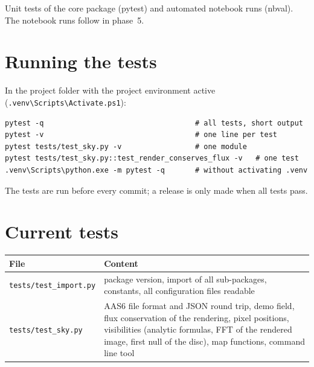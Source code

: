 \label{ch:tests}

Unit tests of the core package (pytest) and automated notebook runs
(nbval). The notebook runs follow in phase~5.

\section{Running the tests}

In the project folder with the project environment active
(\texttt{.venv\textbackslash Scripts\textbackslash Activate.ps1}):
\begin{lstlisting}[basicstyle=\ttfamily\footnotesize, frame=single]
pytest -q                                   # all tests, short output
pytest -v                                   # one line per test
pytest tests/test_sky.py -v                 # one module
pytest tests/test_sky.py::test_render_conserves_flux -v   # one test
.venv\Scripts\python.exe -m pytest -q       # without activating .venv
\end{lstlisting}
The tests are run before every commit; a release is only made when all
tests pass.

\section{Current tests}

\begin{center}
\begin{tabular}{@{}l>{\raggedright\arraybackslash}p{9.5cm}@{}}
\toprule
File & Content \\
\midrule
\texttt{tests/test\_import.py} & package version, import of all
  sub-packages, constants, all configuration files readable \\
\texttt{tests/test\_sky.py} & AAS6 file format and JSON round trip,
  demo field, flux conservation of the rendering, pixel positions,
  visibilities (analytic formulas, FFT of the rendered image, first null
  of the disc), map functions, command line tool \\
\bottomrule
\end{tabular}
\end{center}
